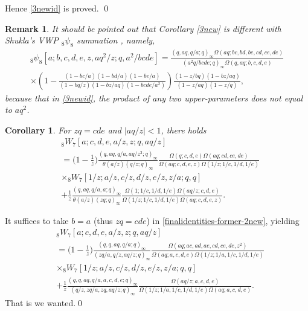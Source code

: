 \documentclass[xits,review,sort&compress]{elsarticle}
\newtheorem{tl}[dl]{Corollary}
\newtheorem{remark}[dl]{Remark}
\numberwithin{equation}{section}
\def\pf{\noindent {\it Proof.} }
\begin{document}
Hence \eqref{3newid} is proved.
\qed
\begin{remark}It should be pointed out that Corollary \ref{3new} is  different with Shukla's VWP ${}_8\psi_8$ summation \cite[Eq. (4.1)]{shukla}, namely,
\begin{align*}{}_8\psi_{8}\left[a; b, c, d, e, z, a q^{2} / z ; q, a^{2}/b c d e\right] =\frac{(q, a q, q / a; q)_{\infty}\Omega(aq;bc,bd,be,cd,ce,de)}{\left( a^{2} q / b c d e ; q\right)_{\infty}\Omega(q,aq; b,  c, d,  e)} \\
\times \left(1-\frac{(1-b c / a)(1-b d / a)(1-b e / a)}{(1-b q / z)(1-b z / a q)\left(1-b c d e / a^{2}\right)}\right) \frac{(1-z / b q)(1-b z / a q)}{(1-z / a q)(1-z / q)}, \end{align*}
because  that  in  \eqref{3newid},  the product  of any two upper-parameters does not equal to $aq^2$.
\end{remark}

\begin{tl}\label{prop49} For $zq=cde$ and $|aq/z|<1$, there holds
\begin{align}
 &{}_{8}W_{7}\left[a; c, d, e, a/z, z ; q, aq/z\right]\nonumber\\
 &=\bigg(1-\frac{1}{z}\bigg)\frac{(q,aq, q /a,aq/z^2; q)_{\infty}}{\theta(a/z)\left(q/z;q\right)_{\infty}}\frac{\Omega(q;c,d,e)\Omega(aq;cd,ce,de)}{\Omega(aq;c,d,e,z)\Omega(1/z;1/c,1/d, 1/e)}\nonumber\\
  &\times{}_{8}W_{7}[1/z ; a/z, c/z, d/z, e/z, z/a; q, q]\label{finished}\\
 &+\frac{1}{z}\frac{(q,aq, q / a, a; q)_{\infty}}{\theta(a/z)(zq; q)_{\infty}}
 \frac{\Omega(1;1/c,1/d,1/e)\Omega(aq/z;c,d,e)}{ \Omega(1/z;1/c,1/d,1/e)\Omega(aq; c, d,  e,z)}. \nonumber
\end{align}
  \end{tl}
\pf  It suffices to take $b=a$ (thus $zq=cde$) in  \eqref{finalidentities-former-2new}, yielding
\begin{align*}
 &{}_{8}W_{7}\left[a; c, d, e, a/z, z ; q, aq/z\right] \nonumber\\
 &=\bigg(1-\frac{1}{z}\bigg)\frac{(q,q,aq, q /a; q)_{\infty}}{\left(zq/a, q/z,aq/z;q\right)_{\infty}}\frac{\Omega(aq;ac,ad,ae,cd,ce,de,z^2)}{\Omega(aq;a,c,d,e)\Omega(1/z;1/a,1/c,1/d, 1/e)}\nonumber\\
  &\times{}_{8}W_{7}[1/z ; a/z, c/z, d/z, e/z, z/a; q, q]\\
 &+\frac{1}{z}\frac{(q,q,aq, q / a,a, c, d, e; q)_{\infty}}{(q/z,zq/a,zq,aq/z; q)_{\infty}}
 \frac{\Omega(aq/z;a,c,d,e)}{ \Omega(1/z;1/a,1/c,1/d,1/e)\Omega(aq; a,  c, d,  e)}. \nonumber
\end{align*}
That is we wanted.\qed
\end{document}

